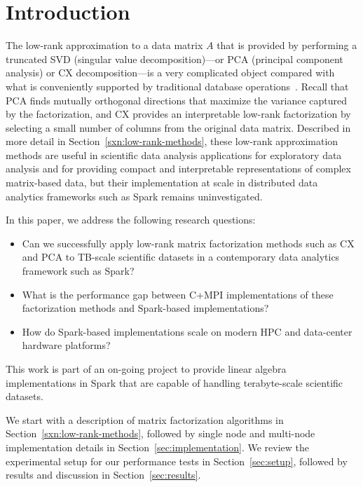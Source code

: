 \section{Introduction}
\label{sec:intro}

The low-rank approximation to a data matrix $A$ that is provided by performing
a truncated SVD (singular value decomposition)---or PCA (principal component
analysis) or CX decomposition---is a very complicated object compared with
what is conveniently supported by traditional database
operations~\cite{Skillicorn07}. Recall that PCA finds mutually orthogonal
directions that maximize the variance captured by the factorization, and CX
provides an interpretable low-rank factorization by selecting a small number of
columns from the original data matrix.  Described in more detail in
Section~\ref{sxn:low-rank-methods}, these low-rank approximation methods are
useful in scientific data analysis applications for exploratory data analysis
and for providing compact and interpretable representations of complex
matrix-based data, but their implementation at scale in distributed data
analytics frameworks such as Spark remains uninvestigated. 

In this paper, we address the following research questions:
\begin{itemize}
  \item Can we successfully apply low-rank matrix factorization methods such as
    CX and PCA to TB-scale scientific datasets in a contemporary data analytics
    framework such as Spark?

  \item What is the performance gap between C+MPI implementations of these
    factorization methods and Spark-based implementations? 

  \item How do Spark-based implementations scale on modern HPC and data-center
    hardware platforms?
\end{itemize}
This work is part of an on-going project to provide linear algebra implementations 
in Spark that are capable of handling terabyte-scale scientific datasets.

We start with a description of matrix factorization algorithms in
Section~\ref{sxn:low-rank-methods}, followed by single node and multi-node
implementation details in Section~\ref{sec:implementation}. We review the
experimental setup for our performance tests in Section~\ref{sec:setup},
followed by results and discussion in Section~\ref{sec:results}.

